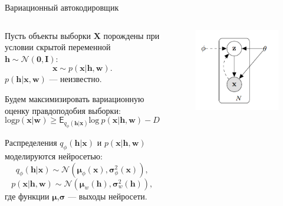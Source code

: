 \documentclass[10pt,pdf,utf8,russian,aspectratio=169]{beamer}
\begin{document}
\begin{frame}{Вариационный автокодировщик}
\begin{columns}[T]
\begin{column}{.65\textwidth}
Пусть объекты выборки $\mathbf{X}$ порождены при условии скрытой переменной $\mathbf{h} \sim \mathcal{N}(\mathbf{0}, \mathbf{I})$:
$$
\mathbf{x} \sim p(\mathbf{x}|\mathbf{h}, \mathbf{w}).
$$
$p(\mathbf{h}|\mathbf{x}, \mathbf{w})$ --- неизвестно.

Будем максимизировать вариационную оценку правдоподобия выборки:
$$
\text{log}p(\mathbf{x}|\mathbf{w}) \geq \mathsf{E}_{q_\phi(\mathbf{h}|\mathbf{x})}\text{log}~p(\mathbf{x}|\mathbf{h}, \mathbf{w}) - D_\text{KL}(q_\phi(\mathbf{h}|\mathbf{x})||p(\mathbf{h})) \to \max.
$$

Распределения $q_\phi(\mathbf{h}|\mathbf{x})$ и $p(\mathbf{x}|\mathbf{h}, \mathbf{w})$ моделируются нейросетью:
$$
q_\phi(\mathbf{h}|\mathbf{x}) \sim \mathcal{N}(\boldsymbol{\mu}_\phi(\mathbf{x}),\boldsymbol{\sigma}_\phi^2(\mathbf{x})), 
$$
$$
p(\mathbf{x}|\mathbf{h}, \mathbf{w}) \sim \mathcal{N}(\boldsymbol{\mu}_w(\mathbf{h}),\boldsymbol{\sigma}_w^2(\mathbf{h})),
$$
где функции $\boldsymbol{\mu}$,$\boldsymbol{\sigma}$ --- выходы нейросети.\\
\end{column}%
\hfill%
\begin{column}{.25\textwidth}
\begin{figure}
  \centering
\includegraphics[width=\textwidth]{graph.png}
\end{figure}
\end{column}
\end{columns}
\end{frame}
\end{document}
